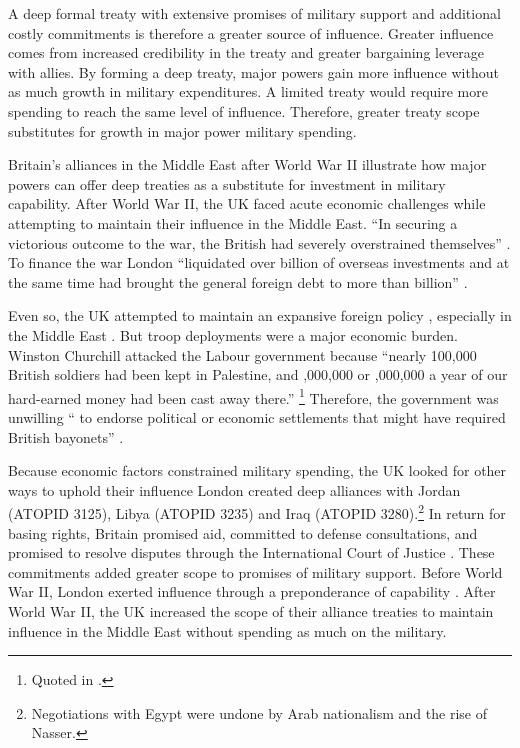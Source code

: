 \documentclass[12pt]{article}
\begin{document}
A deep formal treaty with extensive promises of military support and additional costly commitments is therefore a greater source of influence.
Greater influence comes from increased credibility in the treaty and greater bargaining leverage with allies.  
By forming a deep treaty, major powers gain more influence without as much growth in military expenditures. 
A limited treaty would require more spending to reach the same level of influence. 
Therefore, greater treaty scope substitutes for growth in major power military spending. 


Britain's alliances in the Middle East after World War II illustrate how major powers can offer deep treaties as a substitute for investment in military capability. 
After World War II, the UK faced acute economic challenges while attempting to maintain their influence in the Middle East. 
``In securing a victorious outcome to the war, the British had severely overstrained themselves'' \citep[pg. 367]{Kennedy1987}. 
To finance the war London ``liquidated over  billion of overseas investments and at the same time had brought the general foreign debt to more than  billion'' \citep[pg. 12]{Louis1984}.
 

Even so, the UK attempted to maintain an expansive foreign policy \citep{Mayhew1950}, especially in the Middle East \citep{Rahman1982}. 
But troop deployments were a major economic burden. 
Winston Churchill attacked the Labour government because ``nearly 100,000 British soldiers had been kept in Palestine, and ,000,000 or ,000,000 a year of our hard-earned money had been cast away there.''
\footnote{Quoted in \citet[pg. 11]{Louis1984}.}
Therefore, the government was unwilling `` to endorse political or economic settlements that might have required British bayonets'' \citep[pg. 15]{Louis1984}. 


Because economic factors constrained military spending, the UK looked for other ways to uphold their influence \citep{Monroe1963, Louis1984}
London created deep alliances with Jordan (ATOPID 3125), Libya (ATOPID 3235) and Iraq (ATOPID 3280).\footnote{Negotiations with Egypt were undone by Arab nationalism and the rise of Nasser.} 
In return for basing rights, Britain promised aid, committed to defense consultations, and promised to resolve disputes through the International Court of Justice \citep{Leedsetal2002}. 
These commitments added greater scope to promises of military support. 
Before World War II, London exerted influence through a preponderance of capability \citep{Monroe1963}.
After World War II, the UK increased the scope of their alliance treaties to maintain influence in the Middle East without spending as much on the military. 
\end{document}
